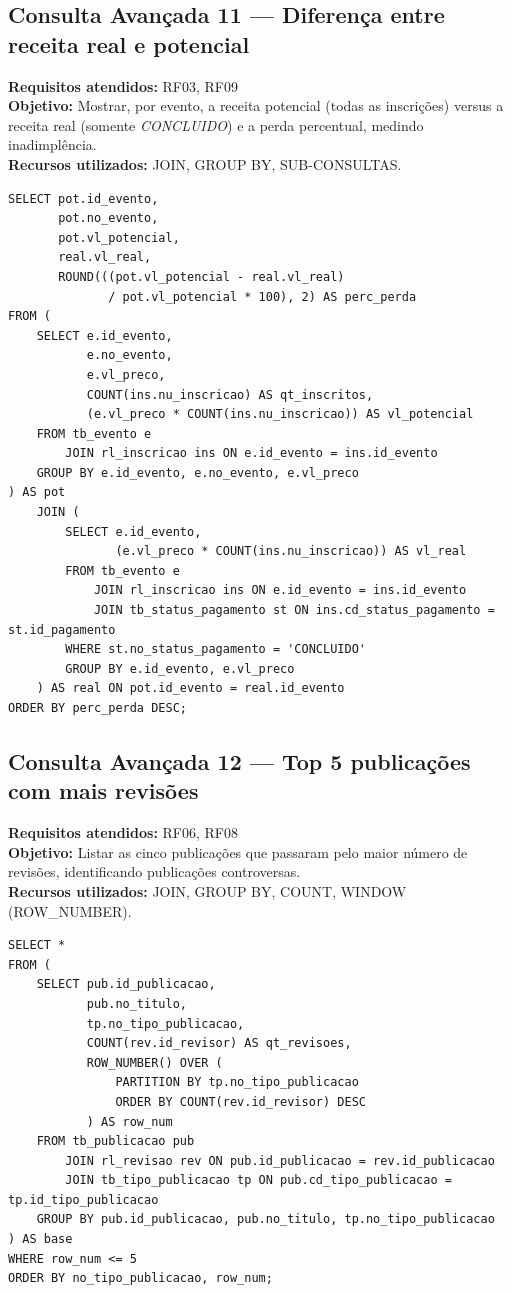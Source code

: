 \documentclass[12pt]{article}
\begin{document}
\subsection{Consulta Avançada 11 --- Diferença entre receita real e potencial}
\textbf{Requisitos atendidos:} RF03, RF09 \\
\textbf{Objetivo:} Mostrar, por evento, a receita potencial (todas as inscrições) versus a receita real (somente \textit{CONCLUIDO}) e a perda percentual, medindo inadimplência. \\
\textbf{Recursos utilizados:} JOIN, GROUP BY, SUB-CONSULTAS.
\begin{lstlisting}[caption={QA11 --- Diferença entre receita real e potencial.}]
SELECT pot.id_evento,
       pot.no_evento,
       pot.vl_potencial,
       real.vl_real,
       ROUND(((pot.vl_potencial - real.vl_real)
              / pot.vl_potencial * 100), 2) AS perc_perda
FROM (
    SELECT e.id_evento,
           e.no_evento,
           e.vl_preco,
           COUNT(ins.nu_inscricao) AS qt_inscritos,
           (e.vl_preco * COUNT(ins.nu_inscricao)) AS vl_potencial
    FROM tb_evento e
        JOIN rl_inscricao ins ON e.id_evento = ins.id_evento
    GROUP BY e.id_evento, e.no_evento, e.vl_preco
) AS pot
    JOIN (
        SELECT e.id_evento,
               (e.vl_preco * COUNT(ins.nu_inscricao)) AS vl_real
        FROM tb_evento e
            JOIN rl_inscricao ins ON e.id_evento = ins.id_evento
            JOIN tb_status_pagamento st ON ins.cd_status_pagamento = st.id_pagamento
        WHERE st.no_status_pagamento = 'CONCLUIDO'
        GROUP BY e.id_evento, e.vl_preco
    ) AS real ON pot.id_evento = real.id_evento
ORDER BY perc_perda DESC;
\end{lstlisting}

\subsection{Consulta Avançada 12 --- Top 5 publicações com mais revisões}
\textbf{Requisitos atendidos:} RF06, RF08 \\
\textbf{Objetivo:} Listar as cinco publicações que passaram pelo maior número de revisões, identificando publicações controversas. \\
\textbf{Recursos utilizados:} JOIN, GROUP BY, COUNT, WINDOW (ROW\_NUMBER).
\begin{lstlisting}[caption={QA12 --- Top 5 publicações com mais revisões (por tipo).}]
SELECT *
FROM (
    SELECT pub.id_publicacao,
           pub.no_titulo,
           tp.no_tipo_publicacao,
           COUNT(rev.id_revisor) AS qt_revisoes,
           ROW_NUMBER() OVER (
               PARTITION BY tp.no_tipo_publicacao
               ORDER BY COUNT(rev.id_revisor) DESC
           ) AS row_num
    FROM tb_publicacao pub
        JOIN rl_revisao rev ON pub.id_publicacao = rev.id_publicacao
        JOIN tb_tipo_publicacao tp ON pub.cd_tipo_publicacao = tp.id_tipo_publicacao
    GROUP BY pub.id_publicacao, pub.no_titulo, tp.no_tipo_publicacao
) AS base
WHERE row_num <= 5
ORDER BY no_tipo_publicacao, row_num;
\end{lstlisting}
\end{document}
